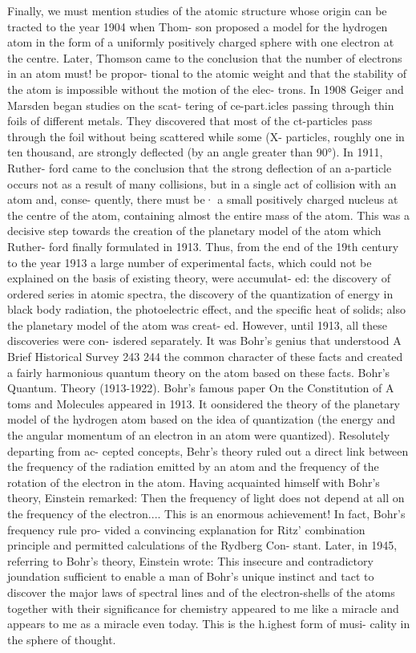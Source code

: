 \documentclass[a4paper,sfsidenotes,colorlinks=true]{tufte-book}
\numberwithin{equation}{section}
\numberwithin{figure}{section}
\begin{document}
{{{{{{Finally, we must mention studies of the atomic structure whose origin can be tracted to the year 1904 when Thom- son proposed a model for the hydrogen atom in the form of a uniformly positively charged sphere with one electron at~ the centre. Later, Thomson came to the conclusion that the number of electrons in an atom must! be propor- tional to the atomic weight and that the stability of the atom is impossible without the motion of the elec- trons. In 1908 Geiger and Marsden began studies on the scat- tering of ce-part.icles passing through thin foils of different metals. They discovered that most of the ct-particles pass through the foil without being scattered while some (X- particles, roughly one in ten thousand, are strongly deflected (by an angle greater than 90°). In 1911, Ruther- ford came to the conclusion that the strong deflection of an a-particle occurs not as a result of many collisions, but in a single act of collision with an atom and, conse- quently, there must be· a small positively charged nucleus at the centre of the atom, containing almost the entire mass of the atom. This was a decisive step towards the creation of the planetary model of the atom which Ruther- ford finally formulated in 1913.
Thus, from the end of the 19th century to the year 1913 a large number of experimental facts, which could not be explained on the basis of existing theory, were accumulat- ed: the discovery of ordered series in atomic spectra, the discovery of the quantization of energy in black body radiation, the photoelectric effect, and the specific heat of solids; also the planetary model of the atom was creat- ed. However, until 1913, all these discoveries were con- isdered separately. It was Bohr's genius that understood
A Brief Historical Survey	243
244
the common character of these facts and created a fairly harmonious quantum theory on the atom based on these facts. Bohr's Quantum. Theory (1913-1922). Bohr's famous paper On the Constitution of A toms and Molecules appeared in 1913. It oonsidered the theory of the planetary model of the hydrogen atom based on the idea of quantization (the energy and the angular momentum of an electron in an atom were quantized). Resolutely departing from ac- cepted concepts, Behr's theory ruled out a direct link between the frequency of the radiation emitted by an atom and the frequency of the rotation of the electron in the atom. Having acquainted himself with Bohr's theory, Einstein remarked: Then the frequency of light does not depend at all on the frequency of the electron.... This is an enormous achievement! In fact, Bohr's frequency rule pro- vided a convincing explanation for Ritz' combination principle and permitted calculations of the Rydberg Con- stant. Later, in 1945, referring to Bohr's theory, Einstein wrote:	This	insecure	and	contradictory	joundation sufficient to enable a man of Bohr's unique instinct and tact to discover the major laws of spectral lines and of the electron-shells of the atoms together with their significance for chemistry appeared to me like a miracle and appears to me as a miracle even today. This is the h.ighest form of musi- cality in the sphere of thought.
}}}}}}
\end{document}
